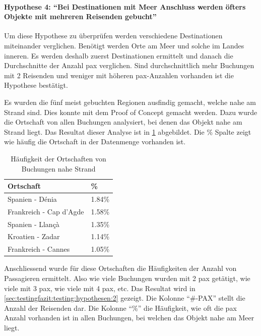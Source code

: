 \paragraph{Hypothese 4: "`Bei Destinationen mit Meer Anschluss werden öfters Objekte mit mehreren Reisenden gebucht"'} Um diese Hypothese zu überprüfen werden verschiedene Destinationen miteinander verglichen. Benötigt werden Orte am Meer und solche im Landes inneren. Es werden deshalb zuerst Destinationen ermittelt und danach die Durchschnitte der Anzahl \gls{pax} verglichen. Sind durchschnittlich mehr Buchungen mit 2 Reisenden und weniger mit höheren \gls{pax}-Anzahlen vorhanden ist die Hypothese bestätigt.

Es wurden die fünf meist gebuchten Regionen ausfindig gemacht, welche nahe am Strand sind. Dies konnte mit dem Proof of Concept gemacht werden. Dazu wurde die Ortschaft von allen Buchungen analysiert, bei denen das Objekt nahe am Strand liegt. Das Resultat dieser Analyse ist in \cref{sec:testingfazit:testing:hypothesen:1} abgebildet. Die \% Spalte zeigt wie häufig die Ortschaft in der Datenmenge vorhanden ist.

\begin{table}[H] 
	\caption{Häufigkeit der Ortschaften von Buchungen nahe Strand}
	\centering
	\label{sec:testingfazit:testing:hypothesen:1}
	\begin{tabular}{ | l | l | } 
		\hline 
		\rowcolor{tableheadcolor}
		\bfseries Ortschaft & \bfseries \% \\ \hline 
		Spanien - Dénia & 1.84\% \\ \hline 
		Frankreich - Cap d'Agde & 1.58\% \\ \hline 
		Spanien - Llançà & 1.35\% \\ \hline 
		Kroatien - Zadar & 1.14\% \\ \hline 
		Frankreich - Cannes & 1.05\% \\ \hline 
	\end{tabular}
\end{table}

Anschliessend wurde für diese Ortschaften die Häufigkeiten der Anzahl von Passagieren ermittelt. Also wie viele Buchungen wurden mit 2 \gls{pax} getätigt, wie viele mit 3 \gls{pax}, wie viele mit 4 \gls{pax}, etc. Das Resultat wird in \cref{sec:testingfazit:testing:hypothesen:2} gezeigt. Die Kolonne "`\#-PAX"' stellt die Anzahl der Reisenden dar. Die Kolonne "`\%"' die Häufigkeit, wie oft die \gls{pax} Anzahl vorhanden ist in allen Buchungen, bei welchen das Objekt nahe am Meer liegt.

